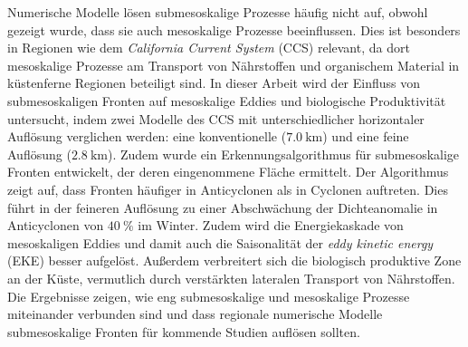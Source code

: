 Numerische Modelle lösen submesoskalige Prozesse häufig nicht auf, obwohl gezeigt wurde, dass sie auch mesoskalige Prozesse beeinflussen. Dies ist besonders in Regionen wie dem \textit{California Current System} (CCS) relevant, da dort mesoskalige Prozesse am Transport von Nährstoffen und organischem Material in küstenferne Regionen beteiligt sind. In dieser Arbeit wird der Einfluss von submesoskaligen Fronten auf mesoskalige Eddies und biologische Produktivität untersucht, indem zwei Modelle des CCS mit unterschiedlicher horizontaler Auflösung verglichen werden: eine konventionelle ($\SI{7.0}{\kilo\metre}$) und eine feine Auflösung ($\SI{2.8}{\kilo\metre}$). Zudem wurde ein Erkennungsalgorithmus für submesoskalige Fronten entwickelt, der deren eingenommene Fläche ermittelt. Der Algorithmus zeigt auf, dass Fronten häufiger in Anticyclonen als in Cyclonen auftreten. Dies führt in der feineren Auflösung zu einer Abschwächung der Dichteanomalie in Anticyclonen von $\SI{40}{\percent}$ im Winter. Zudem wird die Energiekaskade von mesoskaligen Eddies und damit auch die Saisonalität der \textit{eddy kinetic energy} (EKE) besser aufgelöst. Außerdem verbreitert sich die biologisch produktive Zone an der Küste, vermutlich durch verstärkten lateralen Transport von Nährstoffen. Die Ergebnisse zeigen, wie eng submesoskalige und mesoskalige Prozesse miteinander verbunden sind und dass regionale numerische Modelle submesoskalige Fronten für kommende Studien auflösen sollten. 